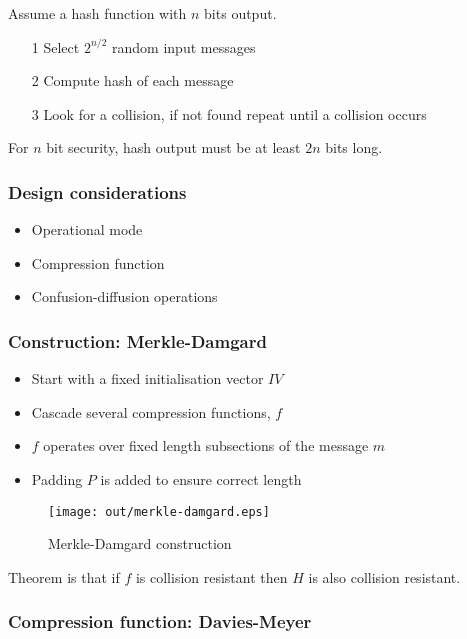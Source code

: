 \documentclass[a4paper]{article}
\begin{document}
Assume a hash function with $n$ bits output.

\begin{enumerate}
  \item[1] Select $2^{n/2}$ random input messages
  \item[2] Compute hash of each message
  \item[3] Look for a collision, if not found repeat until a collision occurs
\end{enumerate}

For $n$ bit security, hash output must be at least $2n$ bits long.

\subsubsection{Design considerations}

\begin{itemize}
  \item Operational mode
  \item Compression function
  \item Confusion-diffusion operations
\end{itemize}

\subsubsection{Construction: Merkle-Damgard}

\begin{itemize}
  \item Start with a fixed initialisation vector $IV$
  \item Cascade several compression functions, $f$
  \item $f$ operates over fixed length subsections of the message $m$
  \item Padding $P$ is added to ensure correct length
\end{itemize}

\begin{figure}[h!]
  \centering
  \texttt{[image: out/merkle-damgard.eps]}
  \caption{Merkle-Damgard construction}
  \label{fig:merkle-damgard}
\end{figure}
\FloatBarrier

Theorem is that if $f$ is collision resistant then $H$ is also collision
resistant.

\subsubsection{Compression function: Davies-Meyer}
\end{document}
